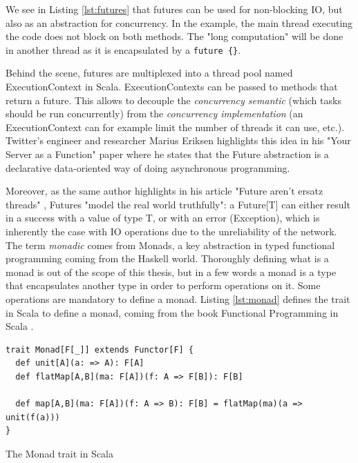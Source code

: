 We see in Listing \ref{lst:futures} that futures can be used for non-blocking IO, but also as an abstraction for concurrency. In the example, the main thread
executing the code does not block on both methods. The "long computation" will be done in another thread as it is encapsulated by a \verb|future {}|.

Behind the scene, futures are multiplexed into a thread pool named ExecutionContext in Scala. ExecutionContexts can be passed to methods that return a future.
This allows to decouple the \textit{concurrency semantic} (which tasks should be run concurrently) from the \textit{concurrency implementation} (an ExecutionContext
can for example limit the number of threads it can use, etc.). Twitter's engineer and researcher Marius Eriksen highlights this idea in his 
"Your Server as a Function" paper  where he states that the Future abstraction is a declarative data-oriented way of doing asynchronous programming.

Moreover, as the same author highlights in his article "Future aren't ersatz threads" , Futures "model the real world truthfully": 
a Future[T] can either result in a success with a value of type T, or with an error (Exception), which is inherently the case with IO operations due to the unreliability of the network.
\\

The term \textit{monadic} comes from Monads, a key abstraction in typed functional programming coming from the Haskell world. Thoroughly defining what is a monad
is out of the scope of this thesis, but in a few words a monad is a type that encapsulates another type in order to perform operations on it. Some operations
are mandatory to define a monad. Listing \ref{lst:monad} defines the trait in Scala to define a monad, coming from the book Functional Programming in Scala
. 

\begin{listing}[h]
\begin{verbatim}
trait Monad[F[_]] extends Functor[F] {
  def unit[A](a: => A): F[A]
  def flatMap[A,B](ma: F[A])(f: A => F[B]): F[B]

  def map[A,B](ma: F[A])(f: A => B): F[B] = flatMap(ma)(a => unit(f(a)))
}
\end{verbatim}
\caption{The Monad trait in Scala}
\label{lst:monad}
\end{listing}

